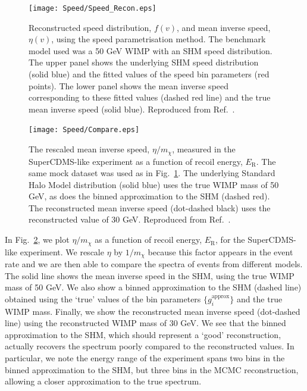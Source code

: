  \begin{figure}[t]
\centering
  \texttt{[image: Speed/Speed\_Recon.eps]}
\caption[Reconstructed speed distribution and mean inverse speed using the binned speed parametrisation]{Reconstructed speed distribution, $f(v)$, and mean inverse speed, $\eta(v)$, using the speed parametrisation method. The benchmark model used was a 50 GeV WIMP with an SHM speed distribution. The upper panel shows the underlying SHM speed distribution (solid blue) and the fitted values of the speed bin parameters (red points). The lower panel shows the mean inverse speed corresponding to these fitted values (dashed red line) and the true mean inverse speed (solid blue). Reproduced from Ref.~\cite{Kavanagh:2012}.}
  \label{fig:Speed:Speed_Recon}
\end{figure}

 \begin{figure}[t]
\centering
  \texttt{[image: Speed/Compare.eps]}
\caption[Reconstructed mean inverse speed for the SuperCDMS-like experiment]{The rescaled mean inverse speed, \(\eta/m_\chi\), measured in the SuperCDMS-like experiment as a function of recoil energy, \(E_\textrm{R}\). The same mock dataset was used as in Fig.\ \ref{fig:Speed:Speed_Recon}. The underlying Standard Halo Model distribution (solid blue) uses the true WIMP mass of 50 GeV, as does the binned approximation to the SHM (dashed red). The reconstructed mean inverse speed (dot-dashed black) uses the reconstructed value of 30 GeV. Reproduced from Ref.~\cite{Kavanagh:2012}.}
  \label{fig:Speed:Compare}
\end{figure}


In Fig.\ \ref{fig:Speed:Compare}, we plot \(\eta/m_\chi\) as a function of recoil energy, \(E_\textrm{R}\), for the SuperCDMS-like experiment. We rescale \(\eta\) by \(1/m_\chi\) because this factor appears in the event rate and we are then able to compare the spectra of events from different models. The solid line shows the mean inverse speed in the SHM, using the true WIMP mass of 50 GeV. We also show a binned approximation to the SHM (dashed line) obtained using the `true' values of the bin parameters \(\{g_i^\textrm{approx}\}\) and the true WIMP mass. Finally, we show the reconstructed mean inverse speed (dot-dashed line) using the reconstructed WIMP mass of 30 GeV. We see that the binned approximation to the SHM, which should represent a `good' reconstruction, actually recovers the spectrum poorly compared to the reconstructed values. In particular, we note the energy range of the experiment spans two bins in the binned approximation to the SHM, but three bins in the MCMC reconstruction, allowing a closer approximation to the true spectrum.

